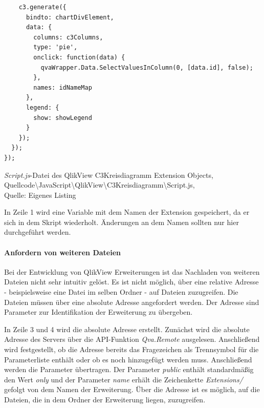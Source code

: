 \begin{listing}[htbp]
\begin{verbatim}
    c3.generate({
      bindto: chartDivElement,
      data: {
        columns: c3Columns,
        type: 'pie',
        onclick: function(data) {
          qvaWrapper.Data.SelectValuesInColumn(0, [data.id], false);
        },
        names: idNameMap
      },
      legend: {
        show: showLegend
      }
    });
  });
});
\end{verbatim}
\caption[\textit{Script.js}-Datei des QlikView C3Kreisdiagramm Extension Objects]{\textit{Script.js}-Datei des QlikView C3Kreisdiagramm Extension Objects, \\Quellcode\textbackslash{}JavaScript\textbackslash{}QlikView\textbackslash{}C3Kreisdiagramm\textbackslash{}Script.js, \\Quelle: Eigenes Listing}
\label{lst:JavascriptC3KreisdiagrammSkript}
\end{listing}



In Zeile 1 wird eine Variable mit dem Namen der Extension gespeichert, da er sich in dem Skript wiederholt. Änderungen an dem Namen sollten nur hier durchgeführt werden.

\paragraph{Anfordern von weiteren Dateien}
\label{lab:QlikViewQvExtAnfordernVonWeiterenDateien} 

Bei der Entwicklung von QlikView Erweiterungen ist das Nachladen von weiteren Dateien nicht sehr intuitiv gelöst. Es ist nicht möglich, über eine relative Adresse - beispielsweise eine Datei im selben Ordner - auf Dateien zuzugreifen. Die Dateien müssen über eine absolute Adresse angefordert werden. Der Adresse sind Parameter zur Identifikation der Erweiterung zu übergeben.

In Zeile 3 und 4 wird die absolute Adresse erstellt. Zunächst wird die absolute Adresse des Servers über die API-Funktion \textit{Qva.Remote} ausgelesen. Anschließend wird festgestellt, ob die Adresse bereits das Fragezeichen als Trennsymbol für die Parameterliste enthält oder ob es noch hinzugefügt werden muss. Anschließend werden die Parameter übertragen. Der Parameter \textit{public} enthält standardmäßig den Wert \textit{only} und der Parameter \textit{name} erhält die Zeichenkette \textit{Extensions/} gefolgt von dem Namen der Erweiterung. Über die Adresse ist es möglich, auf die Dateien, die in dem Ordner der Erweiterung liegen, zuzugreifen.

